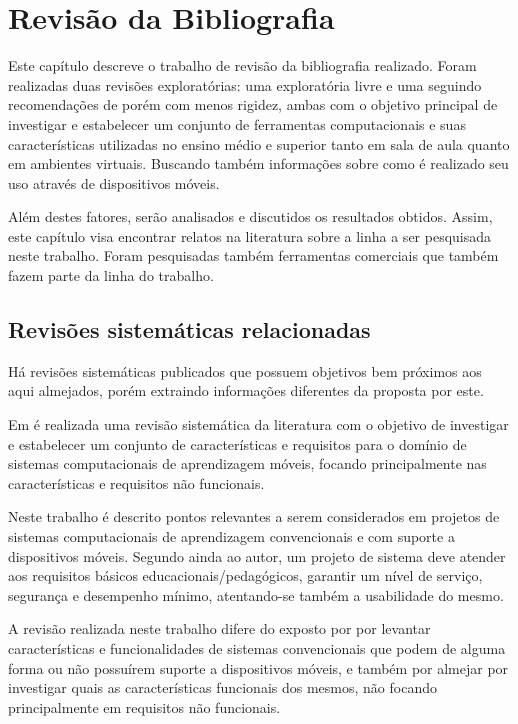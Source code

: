 \chapter{Revisão da Bibliografia}
\label{chap:revisao}

Este capítulo descreve o trabalho de revisão da bibliografia realizado. Foram realizadas duas revisões exploratórias: uma exploratória livre e uma seguindo recomendações de  porém com menos rigidez, ambas com o objetivo principal de investigar e estabelecer um conjunto de ferramentas computacionais e suas características utilizadas no ensino médio e superior tanto em sala de aula quanto em ambientes virtuais. Buscando também informações sobre como é realizado seu uso através de dispositivos móveis. 

Além destes fatores, serão analisados e discutidos os resultados obtidos. Assim, este capítulo visa encontrar relatos na literatura sobre a linha a ser pesquisada neste trabalho. Foram pesquisadas também ferramentas comerciais que também fazem parte da linha do trabalho. 
 
\section{Revisões sistemáticas relacionadas}
Há revisões sistemáticas publicados que possuem objetivos bem próximos aos aqui almejados, porém extraindo informações diferentes da proposta por este.

Em  é realizada uma revisão sistemática da literatura com o objetivo de investigar e estabelecer um conjunto de características e requisitos para o domínio de sistemas computacionais de aprendizagem móveis, focando principalmente nas características e requisitos não funcionais.

Neste trabalho é descrito pontos relevantes a serem considerados em projetos de sistemas computacionais de aprendizagem convencionais e com suporte a dispositivos móveis. Segundo ainda ao autor, um projeto de sistema deve atender aos requisitos básicos educacionais/pedagógicos, garantir um nível de serviço, segurança e desempenho mínimo, atentando-se também a usabilidade do mesmo.

A revisão realizada neste trabalho difere do exposto por  por levantar características e funcionalidades de sistemas convencionais que podem de alguma forma ou não possuírem suporte a dispositivos móveis, e também por almejar por investigar quais as características funcionais dos mesmos, não focando principalmente em requisitos não funcionais.

